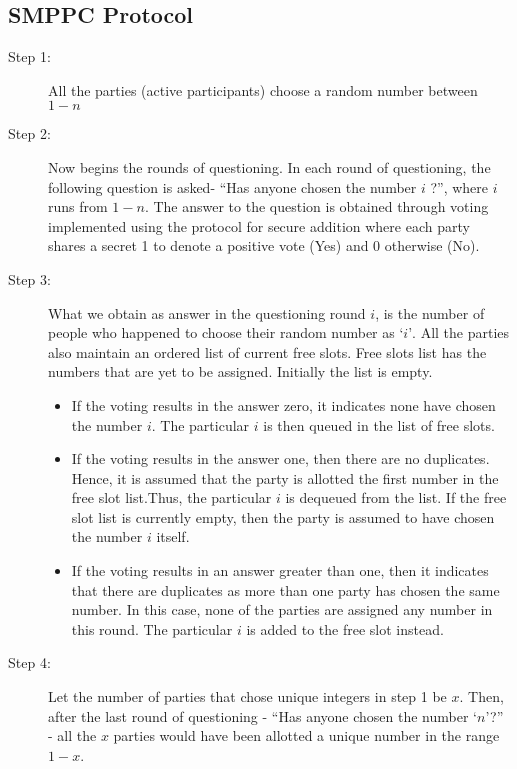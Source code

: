 \documentclass{llncs}
\begin{document}
\subsection{SMPPC Protocol}
\begin{description}
\item[Step 1:]\hspace{2mm} All the parties (active participants) choose a random number between $1 - n$
\item[Step 2:]\hspace{2mm} Now begins the rounds of questioning. In each round of questioning, the following question is asked- “Has anyone chosen the number $i$ ?”, where $i$ runs from $1-n$. The answer to the question is obtained through voting implemented using the protocol for secure addition where each party shares a secret 1 to denote a positive vote (Yes) and 0 otherwise (No).
\item[Step 3:]\hspace{2mm} What we obtain as answer in the questioning round $i$, is the number of people who happened to choose their random number as $‘i’$. All the parties also maintain an ordered list of current free slots. Free slots list has the numbers that are yet to be assigned. Initially the list is empty.
\begin{itemize}
\item If the voting results in the answer zero, it indicates none have chosen the number $i$. The particular $i$ is then queued in the list of free slots.
\item If the voting results in the answer one, then there are no duplicates. Hence, it is assumed that the party is allotted the first number in the free slot list.Thus, the particular $i$ is dequeued from the list. If the free slot list is currently empty, then the party is assumed to have chosen the number $i$ itself.
\item If the voting results in an answer greater than one, then it indicates that there are duplicates as more than one party has chosen the same number. In this case, none of the parties are assigned any number in this round. The particular $i$ is added to the free slot instead.
\end{itemize} 
\item[Step 4:]\hspace{2mm} Let the number of parties that chose unique integers in step 1 be $x$. Then, after the last round of questioning - “Has anyone chosen the number `$n$'?” - all the $x$ parties would have been allotted a unique number in the range $1-x$.

\end{description}
\end{document}
